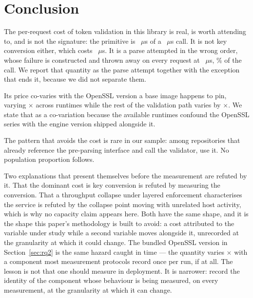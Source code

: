\documentclass[pdflatex,sn-basic,twocolumn]{sn-jnl}%
\begin{document}
\section{Conclusion}\label{sec:conclusion}

The per-request cost of token validation in this library is real, is worth
attending to, and is not the signature: the primitive is \HostHmacString~$\mu$s
of a \HostJwtString~$\mu$s call. It is not key conversion either, which costs
\HostCreateSecretKey~$\mu$s. It is a parse attempted in the wrong order, whose
failure is constructed and thrown away on every request at
\HostProbeThrows~$\mu$s, \HostProbeShareOfCall\% of the call. We report that
quantity as the parse attempt together with the exception that ends it, because
we did not separate them.

Its price co-varies with the OpenSSL version a base image happens to pin, varying
\SpanProbeThrows$\times$ across runtimes while the rest of the validation path
varies by \SpanJwtPreparsed$\times$. We state that as a co-variation because the
available runtimes confound the OpenSSL series with the engine version shipped
alongside it.

The pattern that avoids the cost is rare in our sample: among
\CounterReposWithVerify{} repositories that already reference the pre-parsing
interface and call the validator, \AdjudicatedGenuineProjects{} use it. No
population proportion follows.

Two explanations that present themselves before the measurement are refuted by
it. That the dominant cost is key conversion is refuted by measuring the
conversion. That a throughput collapse under layered enforcement characterises
the service is refuted by the collapse point moving with unrelated host activity,
which is why no capacity claim appears here. Both have the same shape, and it is
the shape this paper's methodology is built to avoid: a cost attributed to the
variable under study while a second variable moves alongside it, unrecorded at
the granularity at which it could change. The bundled OpenSSL version in
Section~\ref{sec:rq2} is the same hazard caught in time --- the quantity varies
\SpanProbeThrows$\times$ with a component most measurement protocols record once
per run, if at all. The lesson is not that one should measure in deployment. It
is narrower: record the identity of the component whose behaviour is being
measured, on every measurement, at the granularity at which it can change.
\end{document}
